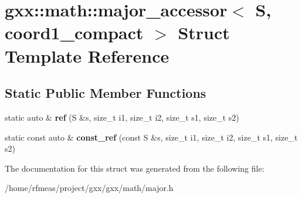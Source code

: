 \hypertarget{structgxx_1_1math_1_1major__accessor_3_01S_00_01coord1__compact_01_4}{}\section{gxx\+:\+:math\+:\+:major\+\_\+accessor$<$ S, coord1\+\_\+compact $>$ Struct Template Reference}
\label{structgxx_1_1math_1_1major__accessor_3_01S_00_01coord1__compact_01_4}
\subsection*{Static Public Member Functions}
\begin{DoxyCompactItemize}
\item 
static auto \& {\bfseries ref} (S \&s, size\+\_\+t i1, size\+\_\+t i2, size\+\_\+t s1, size\+\_\+t s2)\hypertarget{structgxx_1_1math_1_1major__accessor_3_01S_00_01coord1__compact_01_4_a4d82cbd32773b5422dc812493c33fe1d}{}\label{structgxx_1_1math_1_1major__accessor_3_01S_00_01coord1__compact_01_4_a4d82cbd32773b5422dc812493c33fe1d}

\item 
static const auto \& {\bfseries const\+\_\+ref} (const S \&s, size\+\_\+t i1, size\+\_\+t i2, size\+\_\+t s1, size\+\_\+t s2)\hypertarget{structgxx_1_1math_1_1major__accessor_3_01S_00_01coord1__compact_01_4_a4295ff18467cce5981b848f02dad2c97}{}\label{structgxx_1_1math_1_1major__accessor_3_01S_00_01coord1__compact_01_4_a4295ff18467cce5981b848f02dad2c97}

\end{DoxyCompactItemize}


The documentation for this struct was generated from the following file\+:\begin{DoxyCompactItemize}
\item 
/home/rfmeas/project/gxx/gxx/math/major.\+h\end{DoxyCompactItemize}
